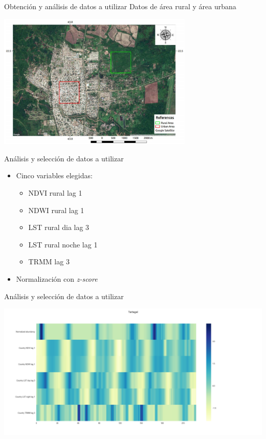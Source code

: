 \documentclass[10pt]{beamer}
\begin{document}
\begin{frame}{Obtención y análisis de datos a utilizar}
  Datos de área rural y área urbana
  \begin{center}
    \includegraphics[width=0.7\textwidth]{zones}
  \end{center}
\end{frame}


\begin{frame}{Análisis y selección de datos a utilizar}
\begin{itemize}
  \item Cinco variables elegidas:
    \begin{itemize}
      \item NDVI rural lag 1
      \item NDWI rural lag 1
      \item LST rural dia lag 3
      \item LST rural noche lag 1
      \item TRMM lag 3
    \end{itemize}
    \item Normalización con \textit{z-score}
\end{itemize}
\end{frame}

\begin{frame}{Análisis y selección de datos a utilizar}
  \begin{center}
    \includegraphics[width=1.22\textwidth]{heatmap}
  \end{center}
\end{frame}
\end{document}
